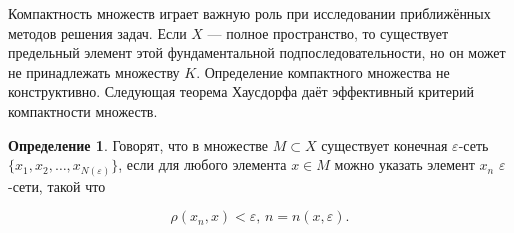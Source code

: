 \documentclass[12pt,a4paper,titlepage,oneside]{book}
\theoremstyle{definition}
\newtheorem*{definition}{Определение}
\theoremstyle{plain}
\theoremstyle{break}
\theoremstyle{remark}
\theoremstyle{remark}
\theoremstyle{remark}
\theoremstyle{remark}
\theoremstyle{plain}
\theoremstyle{plain}
\begin{document}
Компактность множеств играет важную роль при исследовании приближённых методов решения задач.
Если $X$ --- полное пространство, то существует предельный элемент этой фундаментальной подпоследовательности, но он может не принадлежать множеству $K$.
Определение компактного множества не конструктивно. Следующая теорема Хаусдорфа даёт эффективный критерий компактности множеств.

\begin{definition}
Говорят, что в множестве $M \subset X$ существует конечная $\varepsilon$-сеть $\lbrace x_1,x_2,\ldots,x_{N(\varepsilon)} \rbrace$, если для любого элемента $x \in M$ можно указать элемент $x_n$ $\varepsilon$-сети, такой что

$$
\rho(x_n, x) < \varepsilon \mbox{, } n=n(x,\varepsilon).
$$

\end{definition}
\end{document}

